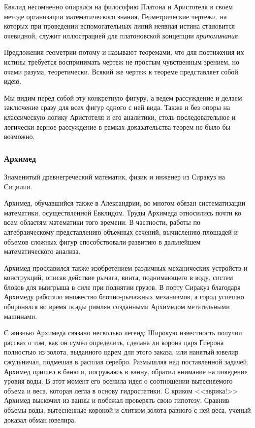 Евклид несомненно опирался на философию Платона и Аристотеля в своем методе организации математического знания. Геометрические чертежи, на которых при проведении вспомогательных линий неявная истина становится очевидной, служит иллюстрацией для платоновской концепции \textit{припоминания}. 

Предложения геометрии потому и называют теоремами, что для постижения их истины требуется воспринимать чертеж не простым чувственным зрением, но очами разума, теоретически. Всякий же чертеж к теореме представляет
собой идею. 

Мы видим перед собой эту конкретную фигуру, а ведем рассуждение и делаем заключение сразу для всех фигур одного с ней вида. Также и без опоры на классическую логику Аристотеля и его аналитики, столь последовательное и логически верное рассуждение в рамках доказательства теорем не было бы возможно.

\subsubsection{Архимед}
Знаменитый древнегреческий математик, физик и инженер из Сиракуз на Сицилии.

Архимед, обучавшийся также в Александрии, во многом обязан систематизации
математики, осуществленной Евклидом. Труды Архимеда относились почти ко всем
областям математики того времени. В частности, работы по алгебраическому представлению объемных сечений, вычислению площадей и объемов сложных фигур способствовали развитию в дальнейшем математического анализа. 

Архимед прославился также изобретением различных механических устройств и конструкций, описав действие рычага, винта, поднимающего в воду, систем блоков для выигрыша в силе при поднятии грузов. В порту Сиракуз благодаря Архимеду работало множество блочно-рычажных механизмов, а город успешно оборонялся во время осады римлян созданными Архимедом метательными машинами. 

С жизнью Архимеда связано несколько легенд:
Широкую известность получил рассказ о том, как он сумел определить, сделана ли корона царя Гиерона полностью из золота, выданного царем для этого заказа, или нанятый ювелир сжульничал, подмешав в расплав серебро. Размышляя над поставленной задачей, Архимед пришел в баню и, погружаясь в ванну, обратил внимание на поведение уровня воды. В этот момент его осенила идея о соотношении вытесняемого объема и веса, которая легла в основу гидростатики. С криком <<эврика!>> Архимед выскочил из ванны и побежал проверять свою гипотезу. Сравнив объемы воды, вытесненные короной и слитком золота равного с ней веса, ученый доказал обман ювелира. 

